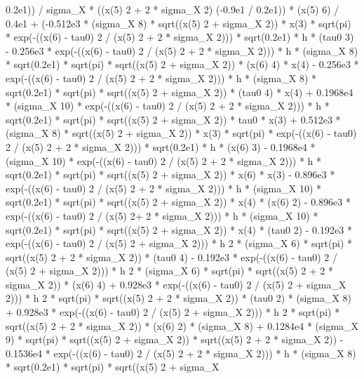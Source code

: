 \begin{maplegroup}
0.2e1)) / sigma\_X * ((x(5)  2 + 2 * sigma\_X  2)  (-0.9e1 / 0.2e1)) * (x(5)  6) / 0.4e1 + (-0.512e3 * (sigma\_X  8) * sqrt((x(5)  2 + sigma\_X  2)) * x(3) * sqrt(pi) * exp(-((x(6) - tau0)  2 / (x(5)  2 + 2 * sigma\_X  2))) * sqrt(0.2e1) * h * (tau0  3) - 0.256e3 * exp(-((x(6) - tau0)  2 / (x(5)  2 + 2 * sigma\_X  2))) * h * (sigma\_X  8) * sqrt(0.2e1) * sqrt(pi) * sqrt((x(5)  2 + sigma\_X  2)) * (x(6)  4) * x(4) - 0.256e3 * exp(-((x(6) - tau0)  2 / (x(5)  2 + 2 * sigma\_X  2))) * h * (sigma\_X  8) * sqrt(0.2e1) * sqrt(pi) * sqrt((x(5)  2 + sigma\_X  2)) * (tau0  4) * x(4) + 0.1968e4 * (sigma\_X  10) * exp(-((x(6) - tau0)  2 / (x(5)  2 + 2 * sigma\_X  2))) * h * sqrt(0.2e1) * sqrt(pi) * sqrt((x(5)  2 + sigma\_X  2)) * tau0 * x(3) + 0.512e3 * (sigma\_X  8) * sqrt((x(5)  2 + sigma\_X  2)) * x(3) * sqrt(pi) * exp(-((x(6) - tau0)  2 / (x(5)  2 + 2 * sigma\_X  2))) * sqrt(0.2e1) * h * (x(6)  3) - 0.1968e4 * (sigma\_X  10) * exp(-((x(6) - tau0)  2 / (x(5)  2 + 2 * sigma\_X  2))) * h * sqrt(0.2e1) * sqrt(pi) * sqrt((x(5)  2 + sigma\_X  2)) * x(6) * x(3) - 0.896e3 * exp(-((x(6) - tau0)  2 / (x(5)  2 + 2 * sigma\_X  2))) * h * (sigma\_X  10) * sqrt(0.2e1) * sqrt(pi) * sqrt((x(5)  2 + sigma\_X  2)) * x(4) * (x(6)  2) - 0.896e3 * exp(-((x(6) - tau0)  2 / (x(5)  2+ 2 * sigma\_X  2))) * h * (sigma\_X  10) * sqrt(0.2e1) * sqrt(pi) * sqrt((x(5)  2 + sigma\_X  2)) * x(4) * (tau0  2) - 0.192e3 * exp(-((x(6) - tau0)  2 / (x(5)  2 + sigma\_X  2))) * h  2 * (sigma\_X  6) * sqrt(pi) * sqrt((x(5)  2 + 2 * sigma\_X  2)) * (tau0  4) - 0.192e3 * exp(-((x(6) - tau0)  2 / (x(5)  2 + sigma\_X  2))) * h  2 * (sigma\_X  6) * sqrt(pi) * sqrt((x(5)  2 + 2 * sigma\_X  2)) * (x(6)  4) + 0.928e3 * exp(-((x(6) - tau0)  2 / (x(5)  2 + sigma\_X  2))) * h  2 * sqrt(pi) * sqrt((x(5)  2 + 2 * sigma\_X  2)) * (tau0  2) * (sigma\_X  8) + 0.928e3 * exp(-((x(6) - tau0)  2 / (x(5)  2 + sigma\_X  2))) * h  2 * sqrt(pi) * sqrt((x(5)  2 + 2 * sigma\_X  2)) * (x(6)  2) * (sigma\_X  8) + 0.1284e4 * (sigma\_X  9) * sqrt(pi) * sqrt((x(5)  2 + sigma\_X  2)) * sqrt((x(5)  2 + 2 * sigma\_X  2)) - 0.1536e4 * exp(-((x(6) - tau0)  2 / (x(5)  2 + 2 * sigma\_X  2))) * h * (sigma\_X  8) * sqrt(0.2e1) * sqrt(pi) * sqrt((x(5)  2 + sigma\_X 
\end{maplegroup}
